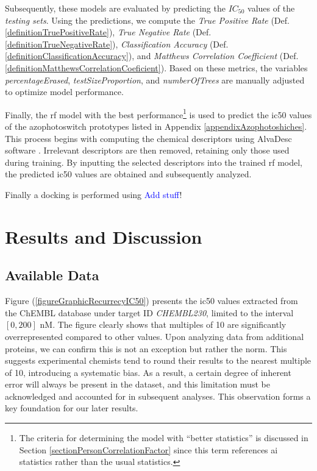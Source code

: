 \documentclass[11pt]{article}
\begin{document}
Subsequently, these models are evaluated by predicting the $IC_{50}$ values of the \emph{testing sets}. Using the predictions, we compute the \emph{True Positive Rate} (Def. \ref{definitionTruePositiveRate}), \emph{True Negative Rate} (Def. \ref{definitionTrueNegativeRate}), \emph{Classification Accuracy} (Def. \ref{definitionClassificationAccuracy}), and \emph{Matthews Correlation Coefficient} (Def. \ref{definitionMatthewsCorrelationCoeficient}). Based on these metrics, the variables \emph{percentageErased}, \emph{testSizeProportion}, and \emph{numberOfTrees} are manually adjusted to optimize model performance.

Finally, the \gls{rf} model with the best performance\footnote{The criteria for determining the model with “better statistics” is discussed in Section \ref{sectionPersonCorrelationFactor} since this term references \gls{ai} statistics rather than the usual statistics.} is used to predict the \gls{ic50} values of the azophotoswitch prototypes listed in Appendix \ref{appendixAzophotoshiches}. This process begins with computing the chemical descriptors using AlvaDesc software \cite{MauriMolecularDescriptorsBook}. Irrelevant descriptors are then removed, retaining only those used during training. By inputting the selected descriptors into the trained \gls{rf} model, the predicted \gls{ic50} values are obtained and subsequently analyzed.

Finally a docking is performed using \textcolor{blue}{Add stuff}!

\newpage
\section{Results and Discussion}\label{sectionResultsAndDiscussion}


\subsection{Available Data}\label{sectionAvailableData}
Figure (\ref{figureGraphicRecurrecyIC50}) presents the \gls{ic50} values extracted from the ChEMBL database under target ID \emph{CHEMBL230}, limited to the interval $[0, 200]$ nM. The figure clearly shows that multiples of 10 are significantly overrepresented compared to other values. Upon analyzing data from additional proteins, we can confirm this is not an exception but rather the norm. This suggests experimental chemists tend to round their results to the nearest multiple of 10, introducing a systematic bias. As a result, a certain degree of inherent error will always be present in the dataset, and this limitation must be acknowledged and accounted for in subsequent analyses. This observation forms a key foundation for our later results.
\end{document}
